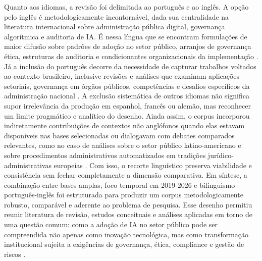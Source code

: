 \documentclass[12pt,a4paper]{article}
\begin{document}
Quanto aos idiomas, a revisão foi delimitada ao português e ao inglês. A opção pelo inglês é metodologicamente incontornável, dada sua centralidade na literatura internacional sobre administração pública digital, governança algorítmica e auditoria de IA. É nessa língua que se encontram formulações de maior difusão sobre padrões de adoção no setor público, arranjos de governança ética, estruturas de auditoria e condicionantes organizacionais da implementação \autocite{madan2022ai} \autocite{sigfrids2022how} \autocite{mkander2023auditing}. Já a inclusão do português decorre da necessidade de capturar trabalhos voltados ao contexto brasileiro, inclusive revisões e análises que examinam aplicações setoriais, governança em órgãos públicos, competências e desafios específicos da administração nacional \autocite{serra2024a} \autocite{goulart2025processos} \autocite{barros2025inteligencia}.
A exclusão sistemática de outros idiomas não significa supor irrelevância da produção em espanhol, francês ou alemão, mas reconhecer um limite pragmático e analítico do desenho. Ainda assim, o corpus incorporou indiretamente contribuições de contextos não anglófonos quando elas estavam disponíveis nas bases selecionadas ou dialogavam com debates comparados relevantes, como no caso de análises sobre o setor público latino-americano e sobre procedimentos administrativos automatizados em tradições jurídico-administrativas europeias \autocite{criado2024inteligencia} \autocite{parycek2023artificial}. Com isso, o recorte linguístico preserva viabilidade e consistência sem fechar completamente a dimensão comparativa.
Em síntese, a combinação entre bases amplas, foco temporal em 2019-2026 e bilinguismo português-inglês foi estruturada para produzir um corpus metodologicamente robusto, comparável e aderente ao problema de pesquisa. Esse desenho permitiu reunir literatura de revisão, estudos conceituais e análises aplicadas em torno de uma questão comum: como a adoção de IA no setor público pode ser compreendida não apenas como inovação tecnológica, mas como transformação institucional sujeita a exigências de governança, ética, compliance e gestão de riscos \autocite{batool2025ai} \autocite{criado2024artificial} \autocite{alhosani2024opportunities}.
\end{document}

